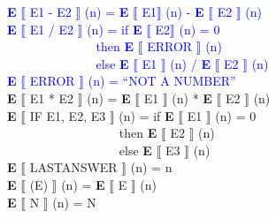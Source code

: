 \textcolor{blue}{\textbf{E} $\llbracket$ E1 - E2 $\rrbracket$ (n) = \textbf{E} $\llbracket$ E1$\rrbracket$ (n) - \textbf{E} $\llbracket$ E2 $\rrbracket$ (n)} \\
\textcolor{blue}{\textbf{E} $\llbracket$ E1 / E2 $\rrbracket$ (n) = if \textbf{E} $\llbracket$ E2$\rrbracket$ (n) = 0\\
$~~~~~~~~~~~~~~~~~~~~~~~~~~~~~~~$ then \textbf{E} $\llbracket$ ERROR $\rrbracket$ (n) \\
$~~~~~~~~~~~~~~~~~~~~~~~~~~~~~~~$ else \textbf{E} $\llbracket$ E1 $\rrbracket$ (n) / \textbf{E} $\llbracket$ E2 $\rrbracket$ (n) \\
\textbf{E} $\llbracket$ ERROR $\rrbracket$ (n) = ``NOT A NUMBER''}\\
\textbf{E} $\llbracket$ E1 * E2 $\rrbracket$ (n) = \textbf{E} $\llbracket$ E1 $\rrbracket$ (n) * \textbf{E} $\llbracket$ E2 $\rrbracket$ (n) \\
\textbf{E} $\llbracket$ IF E1, E2, E3 $\rrbracket$ (n) = if \textbf{E} $\llbracket$ E1 $\rrbracket$ (n) = 0 \\
$~~~~~~~~~~~~~~~~~~~~~~~~~~~~~~~~~~~~~~~~~$then \textbf{E} $\llbracket$ E2 $\rrbracket$ (n) \\
$~~~~~~~~~~~~~~~~~~~~~~~~~~~~~~~~~~~~~~~~~$else \textbf{E} $\llbracket$ E3 $\rrbracket$ (n) \\
\textbf{E} $\llbracket$ LASTANSWER $\rrbracket$ (n) = n \\
\textbf{E} $\llbracket$ (E) $\rrbracket$ (n) = \textbf{E} $\llbracket$ E $\rrbracket$ (n) \\
\textbf{E} $\llbracket$ N $\rrbracket$ (n) = N \\